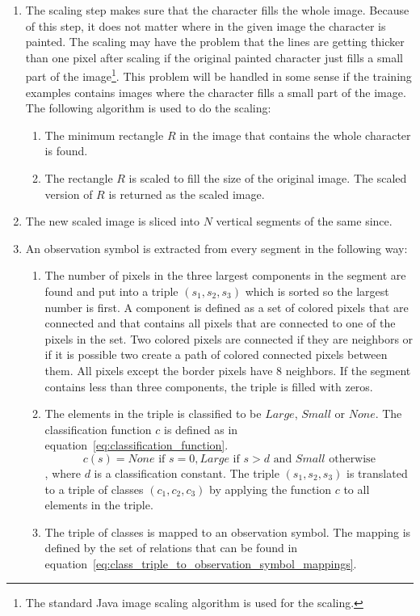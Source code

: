 \begin{enumerate}
  \item The scaling step makes sure that the character fills the whole image. Because of this step, it does not matter where in the given image the character is painted. The scaling may have the problem that the lines are getting thicker than one pixel after scaling if the original painted character just fills a small part of the image\footnote{The standard Java image scaling algorithm is used for the scaling.}. This problem will be handled in some sense if the training examples contains images where the character fills a small part of the image. The following algorithm is used to do the scaling:
  \begin{enumerate}
    \item The minimum rectangle $R$ in the image that contains the whole character is found.
    \item The rectangle $R$ is scaled to fill the size of the original image. The scaled version of $R$ is returned as the scaled image.
  \end{enumerate}
  \item The new scaled image is sliced into $N$ vertical segments of the same since.
  \item An observation symbol is extracted from every segment in the following way:
  \begin{enumerate}
    \item The number of pixels in the three largest components in the segment are found and put into a triple $(s_{1},s_{2},s_{3})$ which is sorted so the largest number is first. A component is defined as a set of colored pixels that are connected and that contains all pixels that are connected to one of the pixels in the set. Two colored pixels are connected if they are neighbors or if it is possible two create a path of colored connected pixels between them. All pixels except the border pixels have 8 neighbors. If the segment contains less than three components, the triple is filled with zeros.
    \item The elements in the triple is classified to be $Large$, $Small$ or $None$. The classification function $c$ is defined as in equation~\ref{eq:classification_function}.
    \begin{equation}\label{eq:classification_function}
    c(s) = None \text{ if } s = 0, Large \text{ if } s > d \text{ and } Small \text{ otherwise}
    \end{equation}, where $d$ is a classification constant. The triple $(s_{1},s_{2},s_{3})$ is translated to a triple of classes $(c_{1},c_{2},c_{3})$ by applying the function $c$ to all elements in the triple.
    \item The triple of classes is mapped to an observation symbol. The mapping is defined by the set of relations that can be found in equation~\ref{eq:class_triple_to_observation_symbol_mappings}.


\end{enumerate}
\end{enumerate}
